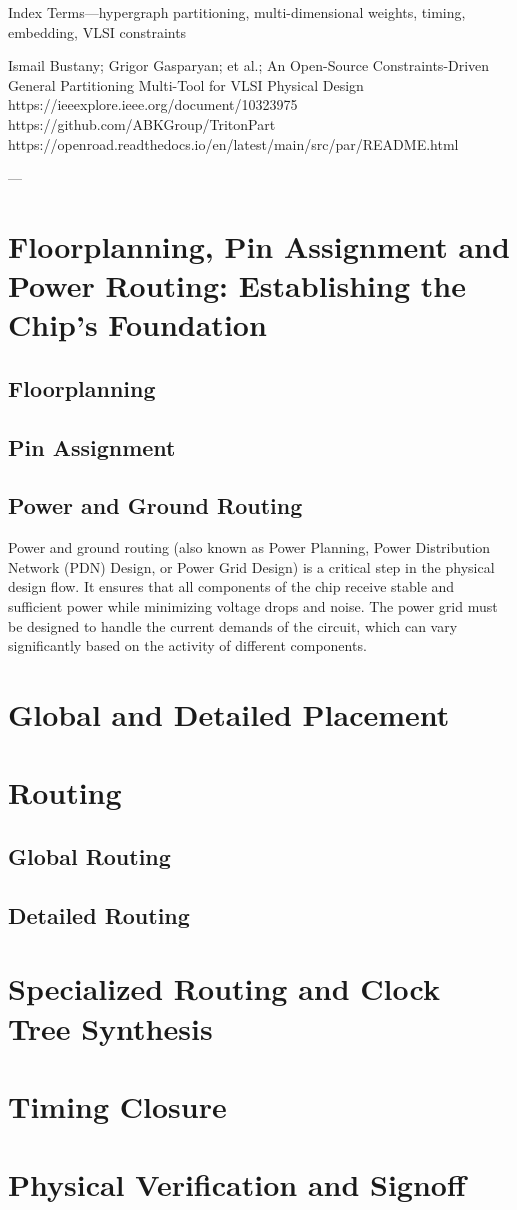 Index Terms—hypergraph partitioning, multi-dimensional weights, timing, embedding, VLSI constraints

Ismail Bustany; Grigor Gasparyan; et al.; An Open-Source Constraints-Driven General Partitioning Multi-Tool for VLSI Physical Design
https://ieeexplore.ieee.org/document/10323975
https://github.com/ABKGroup/TritonPart
https://openroad.readthedocs.io/en/latest/main/src/par/README.html

---

\section{Floorplanning, Pin Assignment and Power Routing: Establishing the Chip's Foundation}

\subsection{Floorplanning}

\subsection{Pin Assignment}

\subsection{Power and Ground Routing}
Power and ground routing (also known as Power Planning, Power Distribution Network (PDN) Design, or Power Grid Design) is a critical step in the physical design flow. It ensures that all components of the chip receive stable and sufficient power while minimizing voltage drops and noise. The power grid must be designed to handle the current demands of the circuit, which can vary significantly based on the activity of different components.

\section{Global and Detailed Placement}

\section{Routing}
\subsection{Global Routing}
\subsection{Detailed Routing}

\section{Specialized Routing and Clock Tree Synthesis}

\section{Timing Closure}

\section{Physical Verification and Signoff}